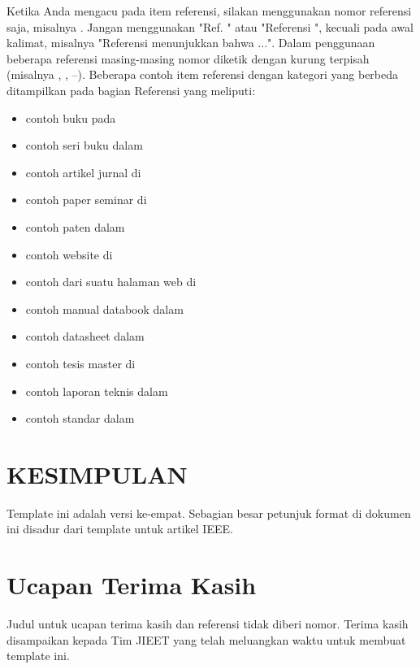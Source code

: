 \documentclass[10pt,twocolumn]{article}
\begin{document}
Ketika Anda mengacu pada item referensi, silakan menggunakan nomor referensi saja, misalnya \cite{metev1998}. Jangan menggunakan "Ref. \cite{breckling1989}" atau "Referensi \cite{zhang1999}", kecuali pada awal kalimat, misalnya "Referensi \cite{zhang1999} menunjukkan bahwa ...". Dalam penggunaan beberapa referensi masing-masing nomor diketik dengan kurung terpisah (misalnya \cite{metev1998}, \cite{breckling1989}, \cite{zhang1999}--\cite{shell2002}). Beberapa contoh item referensi dengan kategori yang berbeda ditampilkan pada bagian Referensi yang meliputi:
\begin{itemize}
\item contoh buku pada \cite{metev1998}
\item contoh seri buku dalam \cite{breckling1989}
\item contoh artikel jurnal di \cite{zhang1999}
\item contoh paper seminar di \cite{wegmuller2000}
\item contoh paten dalam \cite{sorace1997}
\item contoh website di \cite{ieee2002}
\item contoh dari suatu halaman web di \cite{shell2002}
\item contoh manual databook dalam \cite{flexchip1996}
\item contoh datasheet dalam \cite{pdca1999}
\item contoh tesis master di \cite{karnik1999}
\item contoh laporan teknis dalam \cite{padhye1999}
\item contoh standar dalam \cite{ieee8021997}
\end{itemize}

\section{\MakeUppercase{Kesimpulan}}
Template ini adalah versi ke-empat. Sebagian besar petunjuk format di dokumen ini disadur dari template untuk artikel IEEE.

\section*{Ucapan Terima Kasih}
Judul untuk ucapan terima kasih dan referensi tidak diberi nomor. Terima kasih disampaikan kepada Tim JIEET yang telah meluangkan waktu untuk membuat template ini.
\end{document}
